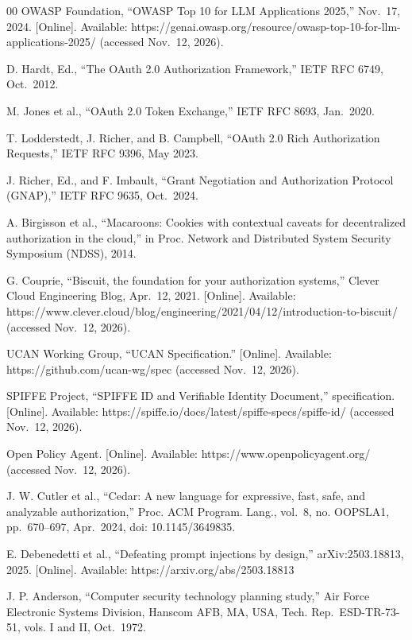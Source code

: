 \documentclass[conference]{IEEEtran}
\begin{document}
\begin{thebibliography}{00}
 OWASP Foundation, ``OWASP Top 10 for LLM Applications 2025,'' Nov.~17, 2024. {[}Online{]}. Available: https://genai.owasp.org/resource/owasp-top-10-for-llm-applications-2025/ (accessed Nov.~12, 2026).

 D. Hardt, Ed., ``The OAuth 2.0 Authorization Framework,'' IETF RFC 6749, Oct.~2012.

 M. Jones et al., ``OAuth 2.0 Token Exchange,'' IETF RFC 8693, Jan.~2020.

 T. Lodderstedt, J. Richer, and B. Campbell, ``OAuth 2.0 Rich Authorization Requests,'' IETF RFC 9396, May 2023.

 J. Richer, Ed., and F. Imbault, ``Grant Negotiation and Authorization Protocol (GNAP),'' IETF RFC 9635, Oct.~2024.

 A. Birgisson et al., ``Macaroons: Cookies with contextual caveats for decentralized authorization in the cloud,'' in Proc. Network and Distributed System Security Symposium (NDSS), 2014.

 G. Couprie, ``Biscuit, the foundation for your authorization systems,'' Clever Cloud Engineering Blog, Apr.~12, 2021. {[}Online{]}. Available: https://www.clever.cloud/blog/engineering/2021/04/12/introduction-to-biscuit/ (accessed Nov.~12, 2026).

 UCAN Working Group, ``UCAN Specification.'' {[}Online{]}. Available: https://github.com/ucan-wg/spec (accessed Nov.~12, 2026).

 SPIFFE Project, ``SPIFFE ID and Verifiable Identity Document,'' specification. {[}Online{]}. Available: https://spiffe.io/docs/latest/spiffe-specs/spiffe-id/ (accessed Nov.~12, 2026).

 Open Policy Agent. {[}Online{]}. Available: https://www.openpolicyagent.org/ (accessed Nov.~12, 2026).

 J. W. Cutler et al., ``Cedar: A new language for expressive, fast, safe, and analyzable authorization,'' Proc. ACM Program. Lang., vol.~8, no. OOPSLA1, pp.~670--697, Apr.~2024, doi: 10.1145/3649835.

 E. Debenedetti et al., ``Defeating prompt injections by design,'' arXiv:2503.18813, 2025. {[}Online{]}. Available: https://arxiv.org/abs/2503.18813

 J. P. Anderson, ``Computer security technology planning study,'' Air Force Electronic Systems Division, Hanscom AFB, MA, USA, Tech. Rep.~ESD-TR-73-51, vols. I and II, Oct.~1972.


\end{thebibliography}
\end{document}
